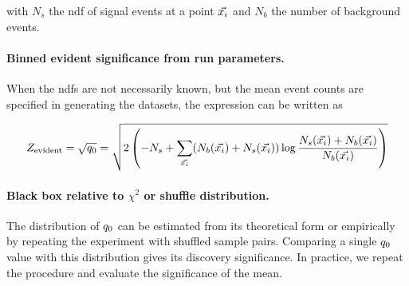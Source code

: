 \documentclass[paper/ddppaper2.tex]{subfiles}
\begin{document}
    with $N_s$ the \gls{ndf} of signal events at a point ${\vec{{x}_i}}$ and $N_b$ the number of background events.

    \paragraph{Binned evident significance from run parameters.}

    When the \glspl{ndf} are not necessarily known, but the mean event counts are specified in generating the datasets, the expression can be written as

    \begin{wideequations}
\begin{equation}
    \label{eq:binwise_significacne}
        Z_\text{evident} = \sqrt{\invllratio} = \sqrt{
            2 \left( -N_s + \sum\limits_{\event} (N_b(\event) + N_s(\event)) \log \dfrac{N_s(\event) + N_b(\event)}{N_b(\event)} \right)
        }
    \end{equation}
\end{wideequations}

\paragraph{Black box relative to $\chi^2$ or shuffle distribution.}

The distribution of ${q_{0}}$ can be estimated from its theoretical form or empirically by repeating the experiment with shuffled sample pairs. Comparing a single ${q_{0}}$ value with this distribution gives its discovery significance. In practice, we repeat the procedure and evaluate the significance of the mean.
\end{document}
